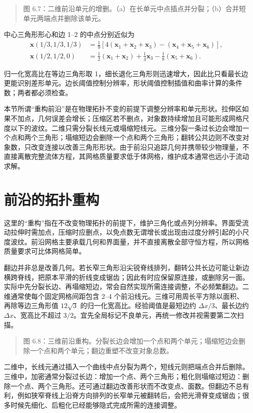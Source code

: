 \documentclass[11pt,a4paper,openany,fontset=none]{ctexbook}
\begin{document}
\begin{quote}\small 图 6.7：二维前沿单元的增删。（a）在长单元中点插点并分裂；（b）合并短单元两端点并删除该单元。\end{quote}
中心三角形形心和边 1--2 的中点分别近似为
\begin{align}
\bm x(1/3,1/3,1/3)&=\frac19[4(\bm x_1+\bm x_2+\bm x_3)
-(\bm x_4+\bm x_5+\bm x_6)],
\tag{6.10}\\
\bm x(1/2,1/2,0)&=\frac12(\bm x_1+\bm x_2)+\frac14\bm x_3
-\frac18(\bm x_5+\bm x_6).
\tag{6.11}
\end{align}

归一化宽高比在等边三角形取 1，细长退化三角形则迅速增大，因此比只看最长边更能识别差形单元。边长阈值控制分辨率，形状阈值控制插值和曲率计算的条件数；两者都必须检查。

本节所谓“重构前沿”是在物理拓扑不变的前提下调整分辨率和单元形状。拉伸区如果不加点，几何误差会增长；压缩区若不删点，对象数持续增加且可能形成网格尺度以下的波纹。二维只需分裂长线元或塌缩短线元。三维分裂一条过长边会增加一个点和两个三角形；塌缩短边会删除一个点和两个三角形；翻转公共边则不改变对象数，只改变连接以改善三角形形状。由于前沿只追踪几何并携带较少物理量，不直接离散完整流体方程，其网格质量要求低于体网格，维护成本通常也远小于流动求解。

\section{前沿的拓扑重构}

这里的“重构”指在不改变物理拓扑的前提下，维护三角化或点列分辨率。界面受流动拉伸时需加点，压缩时应删点，以免点数无谓增长或出现由过度分辨引起的小尺度波纹。前沿网格主要承载几何和界面量，并不直接离散全部守恒方程，所以网格质量要求可比体网格简单。

翻边并非总是改善几何。若长窄三角形沿尖锐脊线排列，翻转公共长边可能让新边横跨脊线，把原本平滑的折线变成锯齿；因此有时应保留原连接，或删除另一面。实际中先分裂长边、再塌缩短边，常会自然实现所需连接调整，不必频繁翻边。二维通常使每个固定网格间距包含 2--4 个前沿线元。三维可用周长平方除以面积、再除等边三角形值 $12\sqrt3$ 的归一化宽高比。经验阈值是最短边约 $\Delta x/3$、最长边约 $\Delta x$、宽高比不超过 $3/2$。宜先全局标记不良单元，再统一修改并视需要第二次扫描。

\begin{quote}\small 图 6.8：三维前沿重构。分裂长边会增加一个点和两个单元；塌缩短边会删除一个点和两个单元；翻边重塑不改变对象总数。\end{quote}
二维中，长线元通过插入一个曲线中点分裂为两个，短线元则把端点合并后删除。三维中，加密通常分裂过长边：增加一个点、两个三角形；粗化则塌缩过短边：删除一个点、两个三角形。还可通过翻边改善形状而不改变点、面数。但翻边不总有利，例如狭窄脊线上沿脊方向排列的长窄单元被翻转后，会把光滑脊变成锯齿；很多时候先细化、后粗化已经能够隐式完成所需的连接调整。
\end{document}

